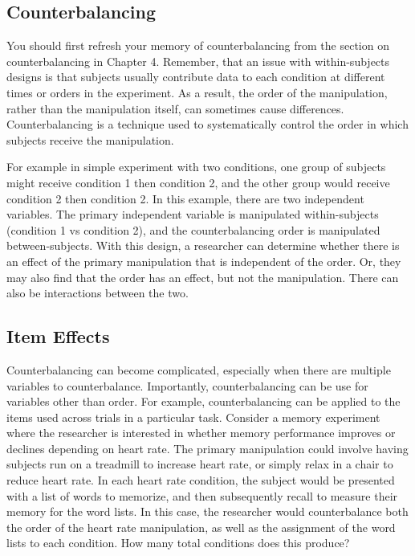 \subsection{Counterbalancing}

You should first refresh your memory of counterbalancing from the section on counterbalancing in Chapter 4. Remember, that an issue with within-subjects designs is that subjects usually contribute data to each condition at different times or orders in the experiment. As a result, the order of the manipulation, rather than the manipulation itself, can sometimes cause differences. Counterbalancing is a technique used to systematically control the order in which subjects receive the manipulation.

For example in simple experiment with two conditions, one group of subjects might receive condition 1 then condition 2, and the other group would receive condition 2 then condition 2. In this example, there are two independent variables. The primary independent variable is manipulated within-subjects (condition 1 vs condition 2), and the counterbalancing order is manipulated between-subjects. With this design, a researcher can determine whether there is an effect of the primary manipulation that is independent of the order. Or, they may also find that the order has an effect, but not the manipulation. There can also be interactions between the two.

\subsection{Item Effects}

Counterbalancing can become complicated, especially when there are multiple variables to counterbalance. Importantly, counterbalancing can be use for variables other than order. For example, counterbalancing can be applied to the items used across trials in a particular task. Consider a memory experiment where the researcher is interested in whether memory performance improves or declines depending on heart rate. The primary manipulation could involve having subjects run on a treadmill to increase heart rate, or simply relax in a chair to reduce heart rate. In each heart rate condition, the subject would be presented with a list of words to memorize, and then subsequently recall to measure their memory for the word lists. In this case, the researcher would counterbalance both the order of the heart rate manipulation, as well as the assignment of the word lists to each condition. How many total conditions does this produce?

